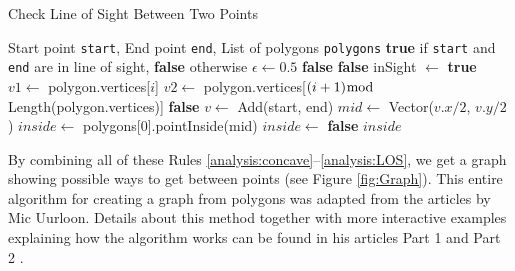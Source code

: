 \begin{algorithm}
\caption{Check Line of Sight Between Two Points}\label{alg:InLineOfSight}
\begin{algorithmic}[1]
\Require Start point \texttt{start}, End point \texttt{end}, List of polygons \texttt{polygons}
\Ensure \textbf{true} if \texttt{start} and \texttt{end} are in line of sight, \textbf{false} otherwise
\Statex
{}
    \State $\epsilon \gets 0.5$
        \State \Return \textbf{false}
    \EndIf
        \State \Return \textbf{false}
    \EndIf
    \State inSight $\gets$ \textbf{true}
            \State $v1 \gets$ polygon.vertices[$i$]
            \State $v2 \gets$ polygon.vertices[$(i+1) \bmod$ Length(polygon.vertices)]
                    \State \Return \textbf{false} 
                \EndIf
            \EndIf
        \EndFor
    \EndFor
    \State $v \gets$ Add(start, end)
    \State $mid \gets$ Vector($v.x / 2$, $v.y / 2$)
    \State $inside \gets$ polygons[0].pointInside(mid)
            \State $inside \gets$ \textbf{false}
        \EndIf
    \EndFor
    \State \Return $inside$
\EndFunction
\end{algorithmic}
\end{algorithm}

By combining all of these Rules \ref{analysis:concave}--\ref{analysis:LOS}, we get a graph showing possible ways to get between points (see Figure \ref{fig:Graph}). This entire algorithm for creating a graph from polygons was adapted from the articles by Mic Uurloon. Details about this method together with more interactive examples explaining how the algorithm works can be found in his articles Part 1 \cite{Uurloon1} and Part 2 \cite{Uurloon2}.

